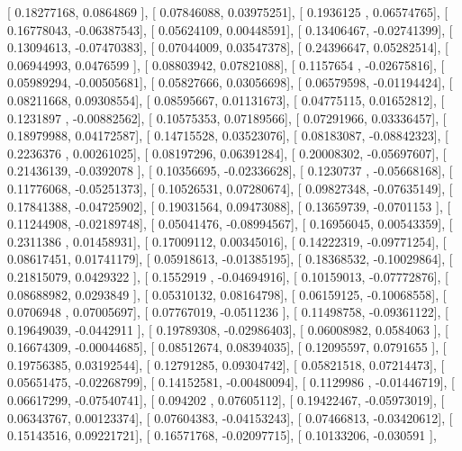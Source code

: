 \documentclass{article}
\begin{document}
       [ 0.18277168,  0.0864869 ],
       [ 0.07846088,  0.03975251],
       [ 0.1936125 ,  0.06574765],
       [ 0.16778043, -0.06387543],
       [ 0.05624109,  0.00448591],
       [ 0.13406467, -0.02741399],
       [ 0.13094613, -0.07470383],
       [ 0.07044009,  0.03547378],
       [ 0.24396647,  0.05282514],
       [ 0.06944993,  0.0476599 ],
       [ 0.08803942,  0.07821088],
       [ 0.1157654 , -0.02675816],
       [ 0.05989294, -0.00505681],
       [ 0.05827666,  0.03056698],
       [ 0.06579598, -0.01194424],
       [ 0.08211668,  0.09308554],
       [ 0.08595667,  0.01131673],
       [ 0.04775115,  0.01652812],
       [ 0.1231897 , -0.00882562],
       [ 0.10575353,  0.07189566],
       [ 0.07291966,  0.03336457],
       [ 0.18979988,  0.04172587],
       [ 0.14715528,  0.03523076],
       [ 0.08183087, -0.08842323],
       [ 0.2236376 ,  0.00261025],
       [ 0.08197296,  0.06391284],
       [ 0.20008302, -0.05697607],
       [ 0.21436139, -0.0392078 ],
       [ 0.10356695, -0.02336628],
       [ 0.1230737 , -0.05668168],
       [ 0.11776068, -0.05251373],
       [ 0.10526531,  0.07280674],
       [ 0.09827348, -0.07635149],
       [ 0.17841388, -0.04725902],
       [ 0.19031564,  0.09473088],
       [ 0.13659739, -0.0701153 ],
       [ 0.11244908, -0.02189748],
       [ 0.05041476, -0.08994567],
       [ 0.16956045,  0.00543359],
       [ 0.2311386 ,  0.01458931],
       [ 0.17009112,  0.00345016],
       [ 0.14222319, -0.09771254],
       [ 0.08617451,  0.01741179],
       [ 0.05918613, -0.01385195],
       [ 0.18368532, -0.10029864],
       [ 0.21815079,  0.0429322 ],
       [ 0.1552919 , -0.04694916],
       [ 0.10159013, -0.07772876],
       [ 0.08688982,  0.0293849 ],
       [ 0.05310132,  0.08164798],
       [ 0.06159125, -0.10068558],
       [ 0.0706948 ,  0.07005697],
       [ 0.07767019, -0.0511236 ],
       [ 0.11498758, -0.09361122],
       [ 0.19649039, -0.0442911 ],
       [ 0.19789308, -0.02986403],
       [ 0.06008982,  0.0584063 ],
       [ 0.16674309, -0.00044685],
       [ 0.08512674,  0.08394035],
       [ 0.12095597,  0.0791655 ],
       [ 0.19756385,  0.03192544],
       [ 0.12791285,  0.09304742],
       [ 0.05821518,  0.07214473],
       [ 0.05651475, -0.02268799],
       [ 0.14152581, -0.00480094],
       [ 0.1129986 , -0.01446719],
       [ 0.06617299, -0.07540741],
       [ 0.094202  ,  0.07605112],
       [ 0.19422467, -0.05973019],
       [ 0.06343767,  0.00123374],
       [ 0.07604383, -0.04153243],
       [ 0.07466813, -0.03420612],
       [ 0.15143516,  0.09221721],
       [ 0.16571768, -0.02097715],
       [ 0.10133206, -0.030591  ],
\end{document}
